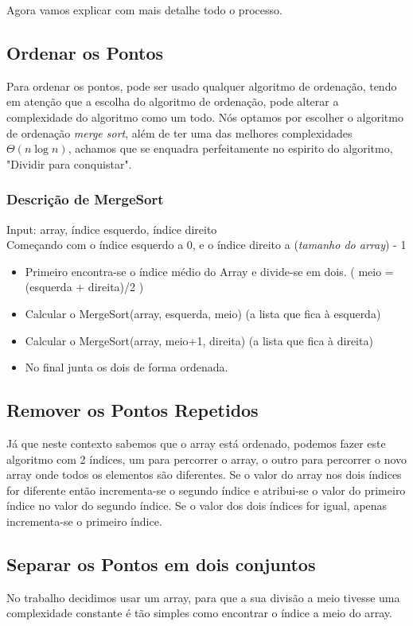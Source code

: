 \documentclass[11pt]{article}
\begin{document}
Agora vamos explicar com mais detalhe todo o processo.
\subsection{ Ordenar os Pontos }
Para ordenar os pontos, pode ser usado qualquer algoritmo de ordenação,
tendo em atenção que a escolha do algoritmo de ordenação, pode alterar a
complexidade do algoritmo como um todo.
Nós optamos por escolher o algoritmo de ordenação \textit{merge sort},
além de ter uma das melhores complexidades $\Theta(n\log{}n)$, achamos 
que se enquadra perfeitamente no espirito do algoritmo, "Dividir para conquistar".

\subsubsection{Descrição de MergeSort}
Input: array, índice esquerdo, índice direito\\

Começando com o índice esquerdo a 0, e o índice direito a (\textit{tamanho do array}) - 1
\begin{itemize}
    \item Primeiro encontra-se o índice médio do Array e divide-se em dois. 
        ( meio = (esquerda + direita)/2 )
    \item Calcular o MergeSort(array, esquerda, meio) (a lista que fica à esquerda)
    \item Calcular o MergeSort(array, meio+1, direita) (a lista que fica à direita)
    \item No final junta os dois de forma ordenada.
\end{itemize}

\subsection{ Remover os Pontos Repetidos }
Já que neste contexto sabemos que o array está ordenado,
podemos fazer este algoritmo com 2 índices, um para percorrer
o array, o outro para percorrer o novo array onde todos os 
elementos são diferentes. Se o valor do array nos dois índices for
diferente então incrementa-se o segundo índice e atribui-se
o valor do primeiro índice no valor do segundo índice. Se o 
valor dos dois índices for igual, apenas incrementa-se o
primeiro índice.

\subsection{ Separar os Pontos em dois conjuntos }
No trabalho decidimos usar um array, para que a sua divisão a meio 
tivesse uma complexidade constante é tão simples como encontrar o 
índice a meio do array.
\end{document}
